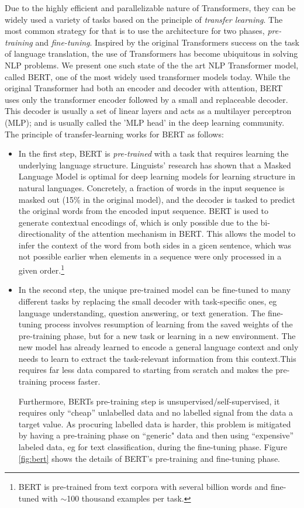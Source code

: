 Due to the highly efficient and parallelizable nature of Transformers, they can be widely used a variety of tasks based on the principle of \emph{transfer learning}. The most common strategy for that is to use the architecture for two phases, \emph{pre-training} and \emph{fine-tuning}. Inspired by the original Transformers success on the task of language translation, the use of Transformers has become ubiquitous in solving NLP problems. We present one such state of the the art NLP Transformer model, 
called BERT\cite{devlinBERTPretrainingDeep2019}, one of the most widely used transformer models today.
While the original Transformer had both an encoder and decoder with attention, BERT uses only the transformer encoder followed by a small and replaceable decoder. This decoder is usually a set of linear layers and acts as a multilayer perceptron (MLP); and is usually called the 'MLP head' in the deep learning community. The principle of transfer-learning works for BERT as follows:

\begin{itemize}
\item In the first step, BERT is \emph{pre-trained} with a task that requires learning the underlying language structure. Linguists' research has shown that a Masked Language Model is optimal for deep learning models for learning structure in natural languages.\cite{wettigShouldYouMask}
Concretely, a fraction of words in the input sequence is masked out (15\% in the original model), and the decoder is tasked to predict the original words from the encoded input sequence.
BERT is used to generate contextual encodings of, which is only possible due to the bi-directionality of the attention mechanism in BERT. This allows the model to infer the context of the word from both sides in a gicen sentence, which was not possible earlier when elements in a sequence were only processed in a given order.\footnote{
    BERT is pre-trained from text corpora with several billion words and fine-tuned with $\sim$100 thousand examples per task.
}

\item In the second step, the unique pre-trained model can be fine-tuned to many different tasks by replacing the small decoder with task-specific ones, eg language understanding, question answering, or text generation.
The fine-tuning process involves resumption of learning from the saved weights of the pre-training phase, but for a new task or learning in a new environment. The new model has already learned to encode a general language context and only needs to learn to extract the task-relevant information from this context.This requires far less data compared to starting from scratch and makes the pre-training process faster.

Furthermore, BERTs pre-training step is unsupervised/self-supervised, \ie it requires only ``cheap'' unlabelled data and no labelled signal from the data a target value. As procuring labelled data is harder, this problem is mitigated by having a pre-training phase on ``generic" data and then using 
``expensive'' labeled data, eg for text classification, during the fine-tuning phase. Figure \ref{fig:bert} shows the details of BERT's pre-training and fine-tuning phase.
\end{itemize}

